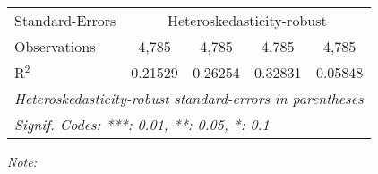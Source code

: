 \begin{table}[htbp!]
\begin{adjustbox}{width = 1\textwidth, max height = 0.95\textheight, center}
\begin{threeparttable}[b]
\begin{tabular}{lcccc}
            \midrule 
            Standard-Errors & \multicolumn{4}{c}{Heteroskedasticity-robust} \\ 
            Observations         & 4,785                          & 4,785                          & 4,785                           & 4,785\\  
            R$^2$                & 0.21529                        & 0.26254                        & 0.32831                         & 0.05848\\  
            \midrule \midrule
            \multicolumn{5}{l}{\emph{Heteroskedasticity-robust standard-errors in parentheses}}\\
            \multicolumn{5}{l}{\emph{Signif. Codes: ***: 0.01, **: 0.05, *: 0.1}}\\
         \end{tabular}
         
         \begin{tablenotes}\item \medskip \textit{Note:}
         \end{tablenotes}
      \end{threeparttable}
   \end{adjustbox}
\end{table}


